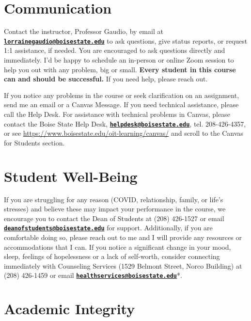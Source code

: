 \documentclass[
  12pt,
]{scrreprt}
\begin{document}
\section{Communication}\label{communication}

Contact the instructor, Professor Gaudio, by email at
\textbf{\href{mailto:lorrainegaudio@boisestate.edu}{\nolinkurl{lorrainegaudio@boisestate.edu}}}
to ask questions, give status reports, or request 1:1 assistance, if
needed. You are encouraged to ask questions directly and immediately.
I'd be happy to schedule an in-person or online Zoom session to help you
out with any problem, big or small. \textbf{Every student in this course
can and should be successful.} If you need help, please reach out.

If you notice any problems in the course or seek clarification on an
assignment, send me an email or a Canvas Message. If you need technical
assistance, please call the Help Desk. For assistance with technical
problems in Canvas, please contact the Boise State Help Desk,
\textbf{\href{mailto:helpdesk@boisestate.edu}{\nolinkurl{helpdesk@boisestate.edu}}},
tel. 208-426-4357, or see
\url{https://www.boisestate.edu/oit-learning/canvas/} and scroll to the
Canvas for Students section.

\section{Student Well-Being}\label{student-well-being}

If you are struggling for any reason (COVID, relationship, family, or
life's stresses) and believe these may impact your performance in the
course, we encourage you to contact the Dean of Students at (208)
426-1527 or email
\textbf{\href{mailto:deanofstudents@boisestate.edu}{\nolinkurl{deanofstudents@boisestate.edu}}}
for support. Additionally, if you are comfortable doing so, please reach
out to me and I will provide any resources or accommodations that I can.
If you notice a significant change in your mood, sleep, feelings of
hopelessness or a lack of self-worth, consider connecting immediately
with Counseling Services (1529 Belmont Street, Norco Building) at (208)
426-1459 or email
\textbf{\href{mailto:healthservices@boisestate.edu}{\nolinkurl{healthservices@boisestate.edu}}}*.

\section{Academic Integrity}\label{academic-integrity}
\end{document}

